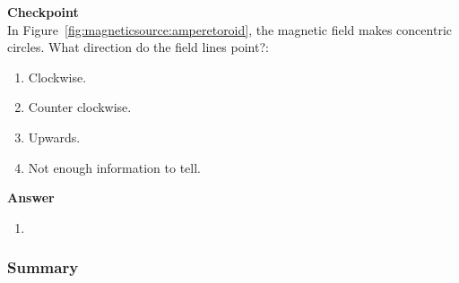 \begin{framed}
\textbf{Checkpoint}\\
In Figure~\ref{fig:magneticsource:amperetoroid}, the magnetic field makes concentric circles. What direction do the field lines point?:

\begin{enumerate}
\item Clockwise.
\item Counter clockwise.
\item Upwards.
\item Not enough information to tell.
\end{enumerate}

\begin{framed}
\textbf{Answer}\\
\begin{enumerate}[resume]
\item
\end{enumerate}
\end{framed}
\end{framed}


\subsubsection{Summary}

